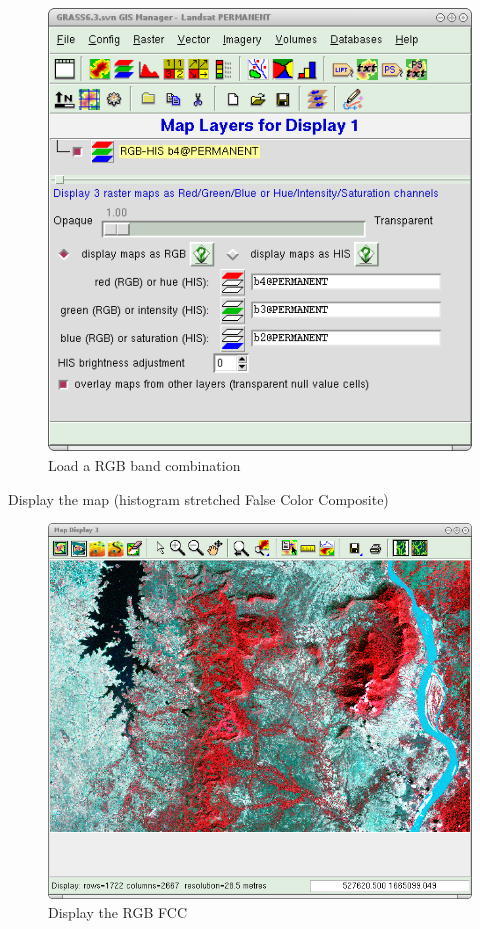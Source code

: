\begin{figure}[htbp]
   \centering
   \includegraphics[scale=0.35]{grass_rs004.png}
   \caption{Load a RGB band combination}
   \label{fig:grass_rs004}
\end{figure}

Display the map (histogram stretched False Color Composite)

\begin{figure}[htbp]
   \centering
   \includegraphics[scale=0.35]{grass_rs005.png}
   \caption{Display the RGB FCC}
   \label{fig:grass_rs005}
\end{figure}

